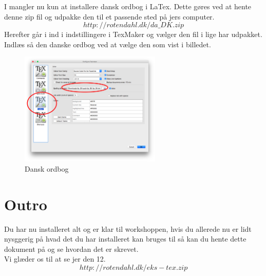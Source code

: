 \documentclass{article}                                                        %
\begin{document}
	I mangler nu kun at installere dansk ordbog i LaTex. 
	Dette gøres ved at hente denne zip fil og udpakke den til et passende sted
	på jers computer.
	$$
		http://rotendahl.dk/da\_DK.zip 
	$$		
	Herefter går i ind i indstillingere i TexMaker og vælger den fil i 
	lige har udpakket. 
	Indlæs så den danske ordbog ved at vælge den som vist i billedet. 
	\begin{figure}[h!]
    	\caption{Dansk ordbog}
        \centering
        \includegraphics[width=0.6\textwidth]{./danish.png}
    \end{figure}
	
	\section{Outro}
	Du har nu installeret alt og er klar til workshoppen, 
	hvis du allerede nu er lidt nysggerig på hvad det du har installeret 
	kan bruges til så kan du hente dette dokument på 	og se hvordan det er skrevet.  \\ Vi glæder os til at se jer den 12. 
		$$
		http://rotendahl.dk/eks-tex.zip 
	$$

   
\end{document}
